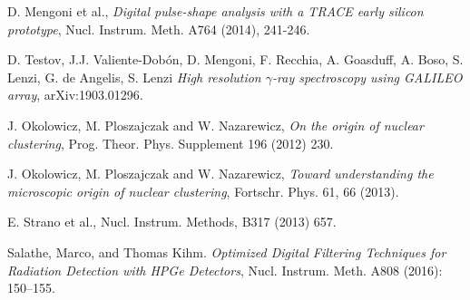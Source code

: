 \begin{thebibliography}{20}

  D. Mengoni et al.,
  \emph{Digital pulse-shape analysis with a TRACE early silicon prototype}, Nucl. Instrum. Meth. A764 (2014), 241-246.

  D. Testov, J.J. Valiente-Dobón, D. Mengoni, F. Recchia, A. Goasduff, A. Boso, S. Lenzi, G. de Angelis, S. Lenzi
  \emph{High resolution $\gamma$-ray spectroscopy using GALILEO array}, arXiv:1903.01296.
  
  J. Okolowicz, M. Ploszajczak and W. Nazarewicz,
  \emph{On the origin of nuclear clustering}, Prog. Theor. Phys. Supplement 196 (2012) 230.

  J. Okolowicz, M. Ploszajczak and W. Nazarewicz,
  \emph{Toward understanding the microscopic origin of nuclear clustering}, Fortschr. Phys. 61, 66 (2013).

  E. Strano et al., Nucl. Instrum. Methods, B317 (2013) 657.
  

Salathe, Marco, and Thomas Kihm. 
\emph{Optimized Digital Filtering Techniques for Radiation Detection with HPGe Detectors}, Nucl. Instrum. Meth. A808 (2016): 150–155.

\end{thebibliography}
